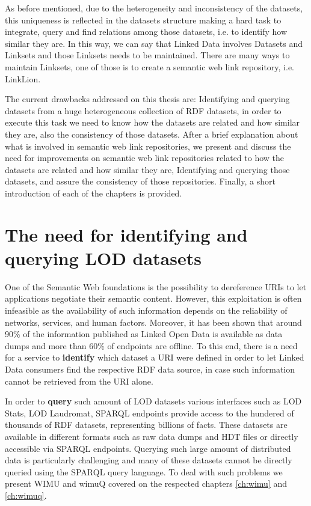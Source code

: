 
As before mentioned, due to the heterogeneity and inconsistency of the datasets, this uniqueness is reflected in the datasets structure making a hard task to integrate, query and find relations among those datasets, i.e. to identify how similar they are. In this way, we can say that Linked Data involves Datasets and Linksets and those Linksets needs to be maintained. There are many ways to maintain Linksets, one of those is to create a semantic web link repository, i.e. LinkLion\cite{linklion2014}.

The current drawbacks addressed on this thesis are: Identifying and querying datasets from a huge heterogeneous collection of RDF datasets, in order to execute this task we need to know how the datasets are related and how similar they are, also the consistency of those datasets. After a brief explanation about what is involved in semantic web link repositories, we present and discuss the need for improvements on semantic web link repositories related to how the datasets are related and how similar they are, Identifying and querying those datasets, and assure the consistency of those repositories. Finally, a short introduction of each of the chapters is provided.

\section{The need for identifying and querying LOD datasets}
One of the Semantic Web foundations is the possibility to dereference URIs to let applications negotiate their semantic content.
However, this exploitation is often infeasible as the availability of such information depends on the reliability of networks, services, and human factors.
Moreover, it has been shown that around 90\% of the information published as Linked Open Data is available as data dumps and more than 60\% of endpoints are offline.
To this end, there is a need for a service to \textbf{identify} which dataset a URI were defined in order to let Linked Data consumers find the respective RDF data source, in case such information cannot be retrieved from the URI alone.

In order to \textbf{query} such amount of LOD datasets various interfaces such as LOD Stats\cite{auer2012lodstats}, LOD Laudromat\cite{beek2014lod}, SPARQL endpoints provide access to the hundered of thousands of RDF datasets, representing billions of facts. These datasets are available in different formats such as raw data dumps and HDT files or directly accessible via SPARQL endpoints. Querying such large amount of distributed data is particularly challenging and many of these datasets cannot be directly queried using the SPARQL query language. To deal with such problems we present WIMU\cite{valdestilhas2018my} and wimuQ\cite{ValdestilhasKcap} covered on the respected chapters \ref{ch:wimu} and \ref{ch:wimuq}.

